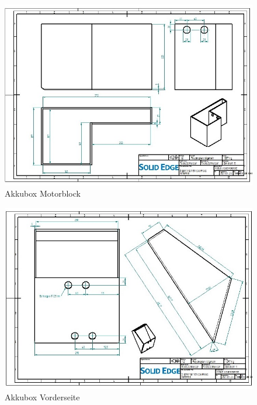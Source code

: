 \begin{figure} [H]
	\begin{center}
		\includegraphics[angle=90]{figures/mechanik/Box_Zeichnung.jpg}
		\caption{Akkubox Motorblock}
		\label{fig:Akkubox Motorblock}
	\end{center}
\end{figure}

\begin{figure} [H]
	\begin{center}
		\includegraphics[angle=90]{figures/mechanik/Box_2_Zeichnung.jpg}
		\caption{Akkubox Vorderseite}
		\label{fig:Akkubox Vorderseite}
	\end{center}
\end{figure}

